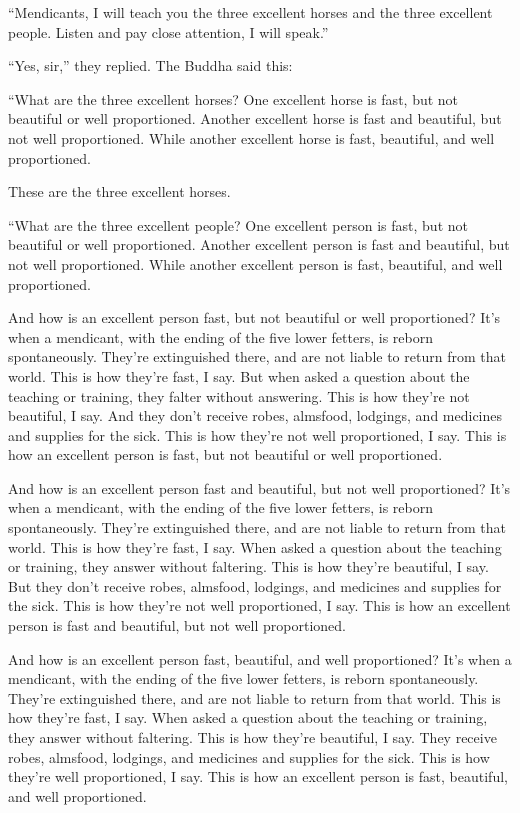 \documentclass[12pt,openany]{book}%
\begin{document}
“Mendicants, I will teach you the three excellent horses and the three excellent people. Listen and pay close attention, I will speak.” 

“Yes, sir,” they replied. The Buddha said this: 

“What are the three excellent horses? One excellent horse is fast, but not beautiful or well proportioned. Another excellent horse is fast and beautiful, but not well proportioned. While another excellent horse is fast, beautiful, and well proportioned. 

These are the three excellent horses. 

“What are the three excellent people? One excellent person is fast, but not beautiful or well proportioned. Another excellent person is fast and beautiful, but not well proportioned. While another excellent person is fast, beautiful, and well proportioned. 

And how is an excellent person fast, but not beautiful or well proportioned? It’s when a mendicant, with the ending of the five lower fetters, is reborn spontaneously. They’re extinguished there, and are not liable to return from that world. This is how they’re fast, I say. But when asked a question about the teaching or training, they falter without answering. This is how they’re not beautiful, I say. And they don’t receive robes, almsfood, lodgings, and medicines and supplies for the sick. This is how they’re not well proportioned, I say. This is how an excellent person is fast, but not beautiful or well proportioned. 

And how is an excellent person fast and beautiful, but not well proportioned? It’s when a mendicant, with the ending of the five lower fetters, is reborn spontaneously. They’re extinguished there, and are not liable to return from that world. This is how they’re fast, I say. When asked a question about the teaching or training, they answer without faltering. This is how they’re beautiful, I say. But they don’t receive robes, almsfood, lodgings, and medicines and supplies for the sick. This is how they’re not well proportioned, I say. This is how an excellent person is fast and beautiful, but not well proportioned. 

And how is an excellent person fast, beautiful, and well proportioned? It’s when a mendicant, with the ending of the five lower fetters, is reborn spontaneously. They’re extinguished there, and are not liable to return from that world. This is how they’re fast, I say. When asked a question about the teaching or training, they answer without faltering. This is how they’re beautiful, I say. They receive robes, almsfood, lodgings, and medicines and supplies for the sick. This is how they’re well proportioned, I say. This is how an excellent person is fast, beautiful, and well proportioned. 
\end{document}
